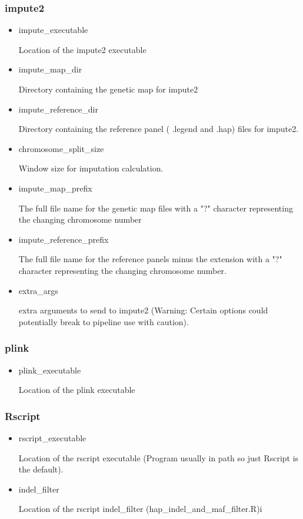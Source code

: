 \documentclass[a4paper,10pt]{article}
\begin{document}
\subsubsection{impute2}
\begin{itemize}
\item impute\_executable 

Location of the impute2 executable
\item impute\_map\_dir

Directory containing the genetic map for impute2
\item impute\_reference\_dir 

Directory containing the reference panel ( .legend and .hap) files for impute2.
\item chromosome\_split\_size

Window size for imputation calculation.
\item impute\_map\_prefix

The full file name for the genetic map files with a "?" character
representing the changing chromosome number
\item impute\_reference\_prefix

The full file name for the reference panels minus the extension with a
"?" character representing the changing chromosome number.
\item extra\_args

extra arguments to send to impute2 (Warning: Certain options could
potentially break to pipeline use with caution).
\end{itemize}
\subsubsection{plink}
\begin{itemize}
\item plink\_executable 

Location of the plink executable
\end{itemize}
\subsubsection{Rscript}
\begin{itemize}
\item rscript\_executable

Location of the rscript executable (Program usually in path so just Rscript is the default).
\item indel\_filter

Location of the rscript indel\_filter (hap\_indel\_and\_maf\_filter.R)i
\end{itemize}
\end{document}
